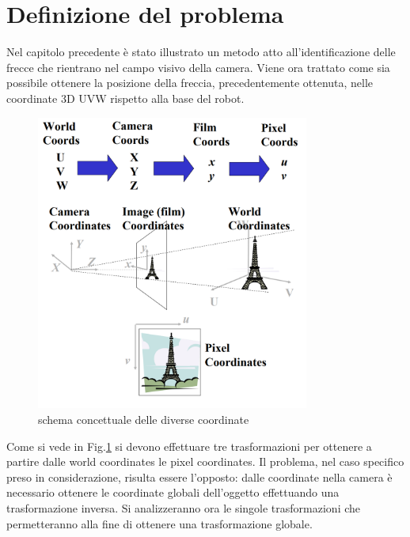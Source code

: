 \section{Definizione del problema}
Nel capitolo precedente è stato illustrato un metodo atto all'identificazione delle frecce che rientrano nel campo visivo della camera. Viene ora trattato come sia possibile ottenere la posizione della freccia, precedentemente ottenuta, nelle coordinate 3D UVW rispetto alla base del robot.

\begin{figure}[H]
	\centering
	\includegraphics[width=0.8\textwidth]{Immagini/world_coords.png}
	\caption{schema concettuale delle diverse coordinate}
	\label{fig:fromcamtoworld}
\end{figure}

Come si vede in Fig.\ref{fig:fromcamtoworld} si devono effettuare tre trasformazioni per ottenere a partire dalle world coordinates le pixel coordinates.
Il problema, nel caso specifico preso in considerazione, risulta essere l'opposto: dalle coordinate nella camera è necessario ottenere le coordinate globali dell'oggetto effettuando una trasformazione inversa.
Si analizzeranno ora le singole trasformazioni che permetteranno alla fine di ottenere una trasformazione globale.
\\

